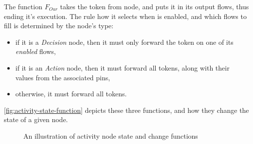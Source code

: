 \begin{definition}
The function \(F_{Our}\) takes the token from node, and puts it in its output flows, thus ending it's execution. The rule how it selects when is enabled, and which flows to fill is determined by the node's type:

\begin{itemize}
\item if it is a \emph{Decision} node, then it must only forward the token on one of its \emph{enabled} flows,
\item if it is an \emph{Action} node, then it must forward all tokens, along with their values from the associated pins,
\item otherwise, it must forward all tokens.
\end{itemize}

\end{definition}

\autoref{fig:activity-state-function} depicts these three functions, and how they change the state of a given node.

\begin{figure}[!ht]
	\centering
	
	\caption{An illustration of activity node state and change functions}
	\label{fig:activity-state-function}
\end{figure}
